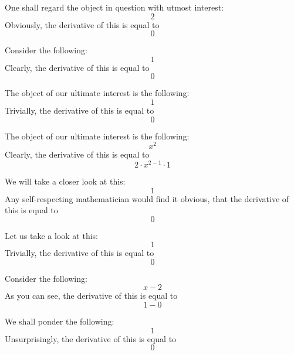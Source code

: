 \documentclass{article}
\begin{document}
One shall regard the object in question with utmost interest:
\begin{equation}
2 
\end{equation}
Obviously, the derivative of this is equal to
\begin{equation}
0 
\end{equation}

Consider the following:
\begin{equation}
1 
\end{equation}
Clearly, the derivative of this is equal to
\begin{equation}
0 
\end{equation}

The object of our ultimate interest is the following:
\begin{equation}
1 
\end{equation}
Trivially, the derivative of this is equal to
\begin{equation}
0 
\end{equation}

The object of our ultimate interest is the following:
\begin{equation}
x ^{2 } 
\end{equation}
Clearly, the derivative of this is equal to
\begin{equation}
2 \cdot x ^{2 - 1 } \cdot 1 
\end{equation}

We will take a closer look at this:
\begin{equation}
1 
\end{equation}
Any self-respecting mathematician would find it obvious, that the derivative of this is equal to
\begin{equation}
0 
\end{equation}

Let us take a look at this:
\begin{equation}
1 
\end{equation}
Trivially, the derivative of this is equal to
\begin{equation}
0 
\end{equation}

Consider the following:
\begin{equation}
x - 2 
\end{equation}
As you can see, the derivative of this is equal to
\begin{equation}
1 - 0 
\end{equation}

We shall ponder the following:
\begin{equation}
1 
\end{equation}
Unsurprisingly, the derivative of this is equal to
\begin{equation}
0 
\end{equation}
\end{document}
